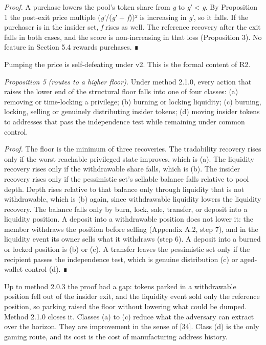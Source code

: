 \emph{Proof.} A purchase lowers the pool's token share from \emph{g} to \emph{g′} \textless{} \emph{g}. By Proposition 1 the post-exit price multiple (\emph{g′}/(\emph{g′} + \emph{f}))² is increasing in \emph{g′}, so it falls. If the purchaser is in the insider set, \emph{f} rises as well. The reference recovery after the exit falls in both cases, and the score is non-increasing in that loss (Proposition 3). No feature in Section 5.4 rewards purchases. ∎

Pumping the price is self-defeating under v2. This is the formal content of R2.

\emph{Proposition 5 (routes to a higher floor).} Under method 2.1.0, every action that raises the lower end of the structural floor falls into one of four classes: (a) removing or time-locking a privilege; (b) burning or locking liquidity; (c) burning, locking, selling or genuinely distributing insider tokens; (d) moving insider tokens to addresses that pass the independence test while remaining under common control.

\emph{Proof.} The floor is the minimum of three recoveries. The tradability recovery rises only if the worst reachable privileged state improves, which is (a). The liquidity recovery rises only if the withdrawable share falls, which is (b). The insider recovery rises only if the pessimistic set's sellable balance falls relative to pool depth. Depth rises relative to that balance only through liquidity that is not withdrawable, which is (b) again, since withdrawable liquidity lowers the liquidity recovery. The balance falls only by burn, lock, sale, transfer, or deposit into a liquidity position. A deposit into a withdrawable position does not lower it: the member withdraws the position before selling (Appendix A.2, step 7), and in the liquidity event its owner sells what it withdraws (step 6). A deposit into a burned or locked position is (b) or (c). A transfer leaves the pessimistic set only if the recipient passes the independence test, which is genuine distribution (c) or aged-wallet control (d). ∎

Up to method 2.0.3 the proof had a gap: tokens parked in a withdrawable position fell out of the insider exit, and the liquidity event sold only the reference position, so parking raised the floor without lowering what could be dumped. Method 2.1.0 closes it. Classes (a) to (c) reduce what the adversary can extract over the horizon. They are improvement in the sense of {[}34{]}. Class (d) is the only gaming route, and its cost is the cost of manufacturing address history.

